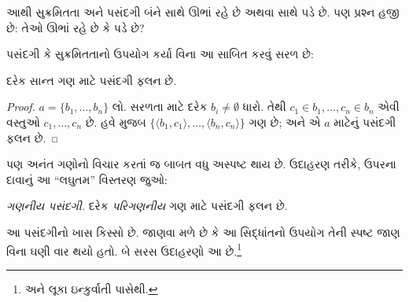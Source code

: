 
આથી સુક્રમિતતા અને પસંદગી બંને સાથે
ઊભાં રહે છે અથવા સાથે પડે છે. પણ પ્રશ્ન
હજી છે: તેઓ ઊભાં રહે છે કે પડે છે?
\endgroup

\begingroup
\makeatletter{}\makeatother

\label{guunit:OLP-0597}


પસંદગી કે સુક્રમિતતાનો ઉપયોગ કર્યા વિના
આ સાબિત કરવું સરળ છે:

\begin{lem}[$\Zminus$માં]
દરેક સાન્ત ગણ માટે પસંદગી ફલન છે.
\end{lem}

\begin{proof}
$a = \{b_1, \ldots, b_n\}$ લો. સરળતા માટે
દરેક $b_i \neq \emptyset$ ધારો. તેથી
$c_1 \in b_1, \ldots, c_n \in b_n$
એવી વસ્તુઓ $c_1, \ldots, c_n$ છે.
હવે 
મુજબ $\{\langle b_1,
c_1\rangle , \ldots, \langle b_n, c_n\rangle\}$
ગણ છે; અને એ $a$ માટેનું પસંદગી ફલન છે.
\end{proof}

પણ અનંત ગણોનો વિચાર કરતાં જ બાબત
વધુ અસ્પષ્ટ થાય છે. ઉદાહરણ તરીકે,
ઉપરના દાવાનું આ ``લઘુતમ'' વિસ્તરણ જુઓ:

\begin{defish}
\emph{ગણનીય પસંદગી.} દરેક \emph{પરિગણનીય}
ગણ માટે પસંદગી ફલન છે.
\end{defish}

આ પસંદગીનો ખાસ કિસ્સો છે. જાણવા મળે છે
કે આ સિદ્ધાંતનો ઉપયોગ તેની સ્પષ્ટ જાણ
વિના ઘણી વાર થયો હતો. બે સરસ ઉદાહરણો
આ છે.\footnote{\citet[\S9.4]{Potter2004}
અને લૂકા ઇન્કુર્વાતી પાસેથી.}


